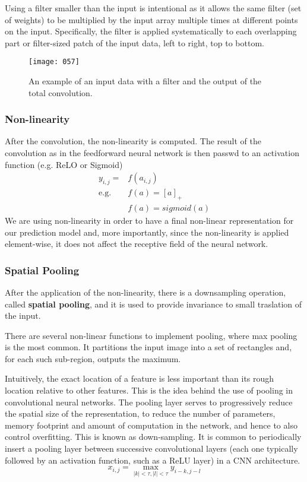 Using a filter smaller than the input is intentional as it allows the same filter (set of weights) to be multiplied by the input array multiple times at different points on the input. Specifically, the filter is applied systematically to each overlapping part or filter-sized patch of the input data, left to right, top to bottom.

\begin{figure}[h!]
    \centering
    \texttt{[image: 057]}
    \caption{An example of an input data with a filter and the output of the total convolution.}
    \label{fig:057}
\end{figure}

\subsubsection{Non-linearity}
After the convolution, the non-linearity is computed. The result of the convolution as in the feedforward neural network is then passwd to an activation function (e.g. ReLO or Sigmoid)
\begin{align*}
    y_{i,j} = &f(a_{i,j})\\
    \text{e.g. } &f(a) = \left[a\right]_+\\
    &f(a) = sigmoid(a)
\end{align*} 
We are using non-linearity in order to have a final non-linear representation for our prediction model and, more importantly, since the non-linearity is applied element-wise, it does not affect the receptive field of the neural network.

\subsubsection{Spatial Pooling}
After the application of the non-linearity, there is a downsampling operation, called \textbf{spatial pooling}, and it is used to provide invariance to small traslation of the input.

There are several non-linear functions to implement pooling, where max pooling is the most common. It partitions the input image into a set of rectangles and, for each such sub-region, outputs the maximum. 

Intuitively, the exact location of a feature is less important than its rough location relative to other features. This is the idea behind the use of pooling in convolutional neural networks. The pooling layer serves to progressively reduce the spatial size of the representation, to reduce the number of parameters, memory footprint and amount of computation in the network, and hence to also control overfitting. This is known as down-sampling. It is common to periodically insert a pooling layer between successive convolutional layers (each one typically followed by an activation function, such as a ReLU layer) in a CNN architecture.
\begin{equation}
    x_{i,j} = \max_{|k| < \tau , |l| < \tau} y_{i-k,j-l}
\end{equation}

